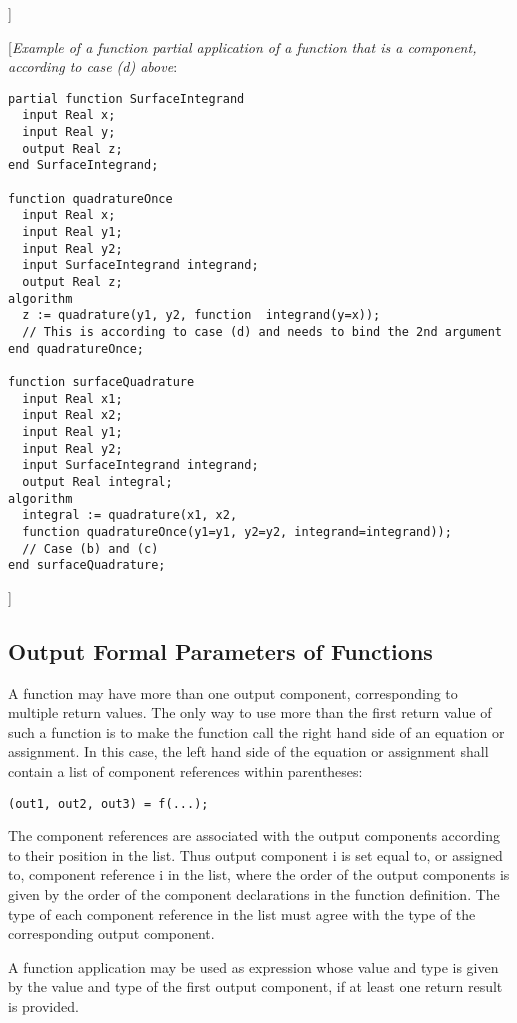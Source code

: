 {]}

{[}\emph{Example of a function partial application of a function that is
a component, according to case (d) above}:

\begin{lstlisting}[language=modelica]
partial function SurfaceIntegrand
  input Real x;
  input Real y;
  output Real z;
end SurfaceIntegrand;

function quadratureOnce
  input Real x;
  input Real y1;
  input Real y2;
  input SurfaceIntegrand integrand;
  output Real z;
algorithm
  z := quadrature(y1, y2, function  integrand(y=x));
  // This is according to case (d) and needs to bind the 2nd argument
end quadratureOnce;

function surfaceQuadrature
  input Real x1;
  input Real x2;
  input Real y1;
  input Real y2;
  input SurfaceIntegrand integrand;
  output Real integral;
algorithm
  integral := quadrature(x1, x2,
  function quadratureOnce(y1=y1, y2=y2, integrand=integrand));
  // Case (b) and (c)
end surfaceQuadrature;
\end{lstlisting}
{]}

\subsection{Output Formal Parameters of Functions}

A function may have more than one output component, corresponding to
multiple return values. The only way to use more than the first return
value of such a function is to make the function call the right hand
side of an equation or assignment. In this case, the left hand side of
the equation or assignment shall contain a list of component references
within parentheses:

\lstinline!(out1, out2, out3) = f(...);!

The component references are associated with the output components
according to their position in the list. Thus output component i is set
equal to, or assigned to, component reference i in the list, where the
order of the output components is given by the order of the component
declarations in the function definition. The type of each component
reference in the list must agree with the type of the corresponding
output component.

A function application may be used as expression whose value and type is
given by the value and type of the first output component, if at least
one return result is provided.

